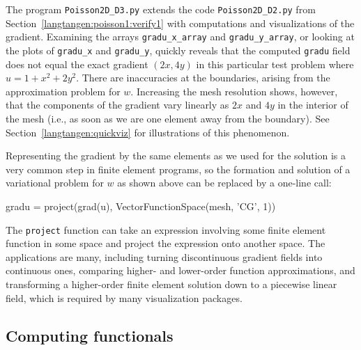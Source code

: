 The program {\fontsize{10pt}{10pt}\verb!Poisson2D_D3.py!} extends the
code {\fontsize{10pt}{10pt}\verb!Poisson2D_D2.py!} from Section~\ref{langtangen:poisson1:verify1}
with computations and visualizations of the gradient.
Examining the arrays {\fontsize{10pt}{10pt}\verb!gradu_x_array!}
and {\fontsize{10pt}{10pt}\verb!gradu_y_array!}, or looking at the plots of
{\fontsize{10pt}{10pt}\verb!gradu_x!} and 
{\fontsize{10pt}{10pt}\verb!gradu_y!}, quickly reveals that
the computed {\fontsize{10pt}{10pt}\texttt{gradu}} field does not equal the exact
gradient $(2x, 4y)$ in this particular test problem where $u=1+x^2+2y^2$. 
There are inaccuracies at the boundaries, arising from the
approximation problem for $w$. Increasing the mesh resolution shows,
however, that the components of the gradient vary linearly as
$2x$ and $4y$ in
the interior of the mesh (i.e., as soon as we are one element away from
the boundary). See Section~\ref{langtangen:quickviz} for illustrations of
this phenomenon.

Representing the gradient by the same elements as we used for the
solution is a very common step in finite element programs, so the
formation and solution of a variational problem for $w$ as shown above
can be replaced by a one-line call:
\begin{python}
gradu = project(grad(u), VectorFunctionSpace(mesh, 'CG', 1))
\end{python}
The {\fontsize{10pt}{10pt}\texttt{project}} function can take an expression involving some
finite element function in some space and project the expression onto
another space.
The applications are many, including turning discontinuous gradient
fields into continuous ones, comparing higher- and lower-order
function approximations, and transforming a higher-order finite element
solution down to a piecewise linear field, which is required by many
visualization packages.

\subsection{Computing functionals}
\label{langtangen:poisson1:functionals}

